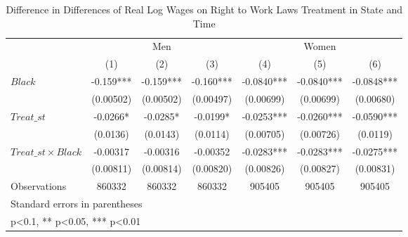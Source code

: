 \begin{table}[htbp]\centering
\def\sym#1{\ifmmode^{#1}\else\(^{#1}\)\fi}
\caption{Difference in Differences of Real Log Wages on Right to Work Laws Treatment in State and Time}
\begin{tabular}{l*{6}{c}}
\hline\hline
                    &\multicolumn{3}{c}{Men}                        &\multicolumn{3}{c}{Women}                      \\\cmidrule(lr){2-4}\cmidrule(lr){5-7}
                    &\multicolumn{1}{c}{(1)}   &\multicolumn{1}{c}{(2)}   &\multicolumn{1}{c}{(3)}   &\multicolumn{1}{c}{(4)}   &\multicolumn{1}{c}{(5)}   &\multicolumn{1}{c}{(6)}   \\
\hline
$ Black $           &      -0.159***&      -0.159***&      -0.160***&     -0.0840***&     -0.0840***&     -0.0848***\\
                    &   (0.00502)   &   (0.00502)   &   (0.00497)   &   (0.00699)   &   (0.00699)   &   (0.00680)   \\
[1em]
$ Treat\_{st} $      &     -0.0266*  &     -0.0285*  &     -0.0199*  &     -0.0253***&     -0.0260***&     -0.0590***\\
                    &    (0.0136)   &    (0.0143)   &    (0.0114)   &   (0.00705)   &   (0.00726)   &    (0.0119)   \\
[1em]
$ Treat\_{st} \times Black $&    -0.00317   &    -0.00316   &    -0.00352   &     -0.0283***&     -0.0283***&     -0.0275***\\
                    &   (0.00811)   &   (0.00814)   &   (0.00820)   &   (0.00826)   &   (0.00827)   &   (0.00831)   \\
\hline
Observations        &      860332   &      860332   &      860332   &      905405   &      905405   &      905405   \\
\hline\hline
\multicolumn{7}{l}{\footnotesize Standard errors in parentheses}\\
\multicolumn{7}{l}{\footnotesize * p<0.1, ** p<0.05, *** p<0.01}\\
\end{tabular}
\end{table}
